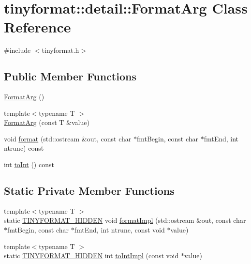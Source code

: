 \hypertarget{classtinyformat_1_1detail_1_1_format_arg}{}\section{tinyformat\+:\+:detail\+:\+:Format\+Arg Class Reference}
\label{classtinyformat_1_1detail_1_1_format_arg}


{\ttfamily \#include $<$tinyformat.\+h$>$}

\subsection*{Public Member Functions}
\begin{DoxyCompactItemize}
\item 
\mbox{\hyperlink{classtinyformat_1_1detail_1_1_format_arg_aa6c926179f24546f26bff058d1a77d39}{Format\+Arg}} ()
\item 
{\footnotesize template$<$typename T $>$ }\\\mbox{\hyperlink{classtinyformat_1_1detail_1_1_format_arg_adec80164e93744f53ae7ecc6a5f6af27}{Format\+Arg}} (const T \&value)
\item 
void \mbox{\hyperlink{classtinyformat_1_1detail_1_1_format_arg_acbf435711bbe4a4da7fc81758d7108a9}{format}} (std\+::ostream \&out, const char $\ast$fmt\+Begin, const char $\ast$fmt\+End, int ntrunc) const
\item 
int \mbox{\hyperlink{classtinyformat_1_1detail_1_1_format_arg_a91b69f66ce9dc8ca2914dce8985d7a1a}{to\+Int}} () const
\end{DoxyCompactItemize}
\subsection*{Static Private Member Functions}
\begin{DoxyCompactItemize}
\item 
{\footnotesize template$<$typename T $>$ }\\static \mbox{\hyperlink{tinyformat_8h_a2c0b8573a0f2148232e2ecfe7afa6ca8}{T\+I\+N\+Y\+F\+O\+R\+M\+A\+T\+\_\+\+H\+I\+D\+D\+EN}} void \mbox{\hyperlink{classtinyformat_1_1detail_1_1_format_arg_a14632665aa1c2ecfbddf35ea23479bfb}{format\+Impl}} (std\+::ostream \&out, const char $\ast$fmt\+Begin, const char $\ast$fmt\+End, int ntrunc, const void $\ast$value)
\item 
{\footnotesize template$<$typename T $>$ }\\static \mbox{\hyperlink{tinyformat_8h_a2c0b8573a0f2148232e2ecfe7afa6ca8}{T\+I\+N\+Y\+F\+O\+R\+M\+A\+T\+\_\+\+H\+I\+D\+D\+EN}} int \mbox{\hyperlink{classtinyformat_1_1detail_1_1_format_arg_a646cd3417730e0a797d37a898bb081be}{to\+Int\+Impl}} (const void $\ast$value)
\end{DoxyCompactItemize}
